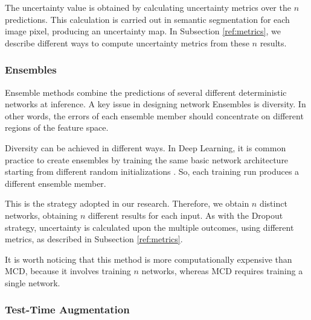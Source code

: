 The uncertainty value is obtained by calculating uncertainty metrics over the $n$ predictions. This calculation is carried out in semantic segmentation for each image pixel, producing an uncertainty map. In Subsection \ref{ref:metrics}, we describe different ways to compute uncertainty metrics from these $n$ results.


\bigskip
\noindent
\subsubsection{Ensembles}

Ensemble methods combine the predictions of several different deterministic networks at inference. A key issue in designing network Ensembles  is diversity. In other words,  the errors of each ensemble member should concentrate on different regions of the feature space.

Diversity can be achieved in different ways. In Deep Learning, it is common practice to create ensembles by training the same basic network architecture starting from different random initializations \cite{lakshminarayanan2017simple}. So, each training run produces a different ensemble member. 

This is the strategy adopted in our research. Therefore, we obtain $n$ distinct networks, obtaining $n$ different results for each input. 
 As with the Dropout strategy, uncertainty is calculated upon the multiple outcomes, using different metrics, as described in Subsection \ref{ref:metrics}.


It is worth noticing that this method is more computationally expensive than MCD, because it involves training $n$ networks, whereas MCD requires training a single network. %

\bigskip
\noindent
\subsubsection{Test-Time Augmentation}

